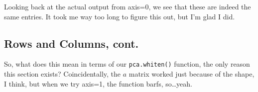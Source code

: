 \documentclass{article}
\begin{document}
Looking back at the actual output from axis=0, we see that these are
indeed the same entries.  It took me way too long to figure this out,
but I'm glad I did.

\subsection{Rows and Columns, cont.}
\label{sec:rowsandcols2}

So, what does this mean in terms of our \verb|pca.whiten()| function,
the only reason this section exists?  Coincidentally, the $a$
matrix worked just because of the shape, I think, but when we try
axis=1, the function barfs, so\ldots yeah.
\end{document}
